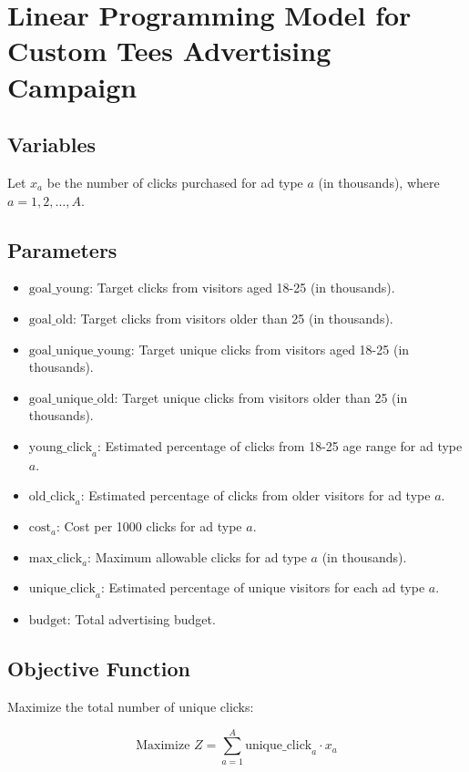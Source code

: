 \documentclass{article}
\begin{document}
\section*{Linear Programming Model for Custom Tees Advertising Campaign}

\subsection*{Variables}
Let \( x_a \) be the number of clicks purchased for ad type \( a \) (in thousands), where \( a = 1, 2, \ldots, A \).

\subsection*{Parameters}
\begin{itemize}
    \item \( \text{goal\_young} \): Target clicks from visitors aged 18-25 (in thousands).
    \item \( \text{goal\_old} \): Target clicks from visitors older than 25 (in thousands).
    \item \( \text{goal\_unique\_young} \): Target unique clicks from visitors aged 18-25 (in thousands).
    \item \( \text{goal\_unique\_old} \): Target unique clicks from visitors older than 25 (in thousands).
    \item \( \text{young\_click}_a \): Estimated percentage of clicks from 18-25 age range for ad type \( a \).
    \item \( \text{old\_click}_a \): Estimated percentage of clicks from older visitors for ad type \( a \).
    \item \( \text{cost}_a \): Cost per 1000 clicks for ad type \( a \).
    \item \( \text{max\_click}_a \): Maximum allowable clicks for ad type \( a \) (in thousands).
    \item \( \text{unique\_click}_a \): Estimated percentage of unique visitors for each ad type \( a \).
    \item \( \text{budget} \): Total advertising budget.
\end{itemize}

\subsection*{Objective Function}
Maximize the total number of unique clicks:

\[
\text{Maximize } Z = \sum_{a=1}^{A} \text{unique\_click}_a \cdot x_a
\]
\end{document}
